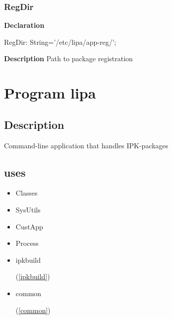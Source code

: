 \documentclass{report}
\newif\ifpdf
\begin{document}
\subsection*{RegDir}
\fi
\label{ipkhandle-RegDir}
\begin{list}{}{
\setlength{\itemindent}{0cm}
\setlength{\listparindent}{0cm}
\setlength{\leftmargin}{\evensidemargin}
\addtolength{\leftmargin}{\tmplength}
\settowidth{\labelsep}{X}
\addtolength{\leftmargin}{\labelsep}
\setlength{\labelwidth}{\tmplength}
}
\item[\textbf{Declaration}\hfill]
\ifpdf
\begin{flushleft}
\fi
\begin{ttfamily}
RegDir: String='/etc/lipa/app-reg/';\end{ttfamily}

\ifpdf
\end{flushleft}
\fi

\par
\item[\textbf{Description}]
Path to package registration

\end{list}
\chapter{Program lipa}
\label{lipa}
\section{Description}
Command{-}line application that handles IPK{-}packages
\section{uses}
\begin{itemize}
\item \begin{ttfamily}Classes\end{ttfamily}\item \begin{ttfamily}SysUtils\end{ttfamily}\item \begin{ttfamily}CustApp\end{ttfamily}\item \begin{ttfamily}Process\end{ttfamily}\item \begin{ttfamily}ipkbuild\end{ttfamily}(\ref{ipkbuild})\item \begin{ttfamily}common\end{ttfamily}(\ref{common})\end{itemize}
\end{document}
